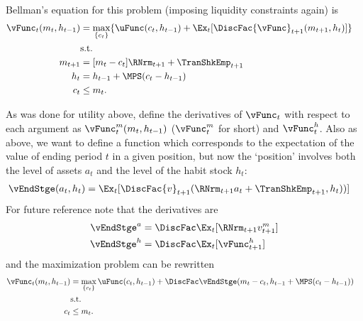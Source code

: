 \documentclass[titlepage, headings=optiontotocandhead]{\econtex}
\begin{document}
{  Bellman's equation for this problem (imposing liquidity constraints again) is
  \begin{equation}\begin{gathered}\begin{aligned}
        {\vFunc}_{t}({m}_{t},h_{t-1})  & = \max_{\{{c}_{t}\}}  \{\uFunc({c}_{t},h_{t-1}) +
        \Ex_{t}[\DiscFac  {\vFunc}_{t+1}({m}_{t+1},h_{t}) ]\}
        \\ & \text{s.t.} & \nonumber \\
        {m}_{t+1}  & = [{m}_{t}-{c}_{t}]\RNrm_{t+1} + \TranShkEmp_{t+1}\\
        h_{t}  & = h_{t-1} + \MPS ({c}_{t} - h_{t-1} ) \\
        {c}_{t} & \leq  {m}_{t} .
      \end{aligned}\end{gathered}\end{equation}

  As was done for utility above, define the derivatives of ${\vFunc}_{t}$ with
  respect to each argument as ${\vFunc}_{t}^{m}({m}_{t},h_{t-1})$ (${\vFunc}_{t}^{m}$
  for short) and ${\vFunc}_{t}^{h}$.  Also as above, we want to
  define a function which corresponds to the expectation of the value of
  ending period $t$ in a given position, but now the `position'
  involves both the level of assets ${a}_{t}$ and the level of the habit
  stock $h_{t}$:
  \begin{equation}\begin{gathered}\begin{aligned}
        \vEndStge({a}_{t},h_{t})  & = \Ex_{t}[\DiscFac {v}_{t+1}(\RNrm_{t+1} {a}_{t}+{\TranShkEmp}_{t+1},h_{t}))]
      \end{aligned}\end{gathered}\end{equation}
  For future reference note that the derivatives are
  \begin{equation}\begin{gathered}\begin{aligned}
        \vEndStge^{{a}}  & = \DiscFac \Ex_{t} [\RNrm_{t+1} {v}_{t+1}^{m}] \label{eq:vEndsdefn} \\
        \vEndStge^{h}  & = \DiscFac \Ex_{t} [{\vFunc}_{t+1}^{h}] \label{eq:vEndhdefn}
      \end{aligned}\end{gathered}\end{equation}
  and the maximization problem can be rewritten
  \begin{equation}\begin{gathered}\begin{aligned}
        {\vFunc}_{t}({m}_{t},h_{t-1}) 
        & =                                         \max_{\{{c}_{t}\}} %
        \uFunc({c}_{t},h_{t-1})  +  \DiscFac
        \vEndStge({m}_{t}-{c}_{t},h_{t-1}+\MPS({c}_{t}-h_{t-1}))
        \\        & \text{s.t.} & \nonumber
        \\  {c}_{t} & \leq  {m}_{t}.
      \end{aligned}\end{gathered}\end{equation}

}
\end{document}
